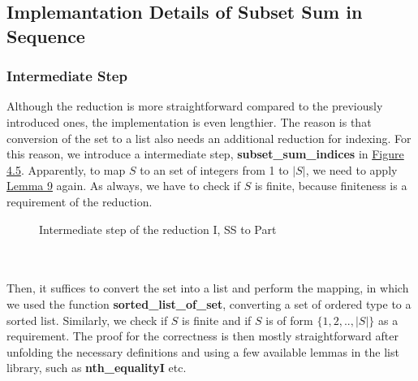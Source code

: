 \subsection{Implemantation Details of Subset Sum in Sequence}
\subsubsection*{Intermediate Step}
Although the reduction is more straightforward compared to the previously introduced ones, the implementation is even lengthier. 
The reason is that conversion of the set to a list also needs an additional reduction for indexing. For this reason, we introduce 
a intermediate step, \textbf{subset\_sum\_indices} in \hyperref[fig:4.5]{Figure 4.5}.
Apparently, to map $S$ to an set of integers from 1 to $|S|$, we need to apply \hyperref[lemma:9]{Lemma 9} again. 
As always, we have to check if $S$ is finite, because finiteness is a requirement of the reduction.
\begin{figure}[!h]
    \caption{Intermediate step of the reduction I, SS to Part}
    \label{fig:4.6}
\end{figure}\\\\
Then, it suffices to convert the set into a list and perform the mapping, in which we used the function 
\textbf{sorted\_list\_of\_set}, converting a set of ordered type to a sorted list. Similarly, we check if 
$S$ is finite and if $S$ is of form $\{1, 2, .. , |S|\}$ as a requirement. The proof for the correctness is then mostly straightforward
after unfolding the necessary definitions and using a few available lemmas in the list library, such as \textbf{nth\_equalityI} etc. 

